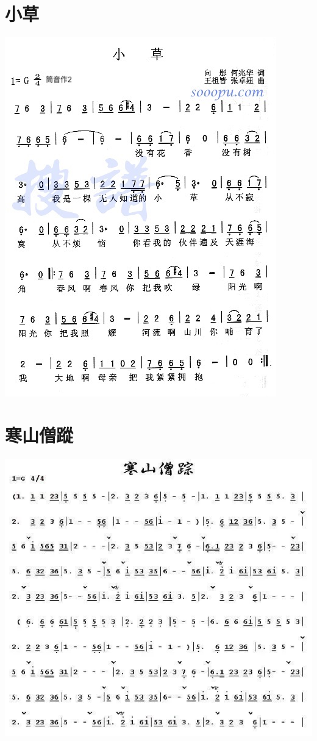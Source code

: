 \documentclass[cn,pad,twocol]{elegantbook}
\begin{document}
\section{小草}
	\includegraphics[width=\textwidth]{dongxiao/20200627-小草.jpg}  
\section{寒山僧蹤}
	\includegraphics[width=\textwidth]{dongxiao/20200724-寒山僧踪2}  
\end{document}
